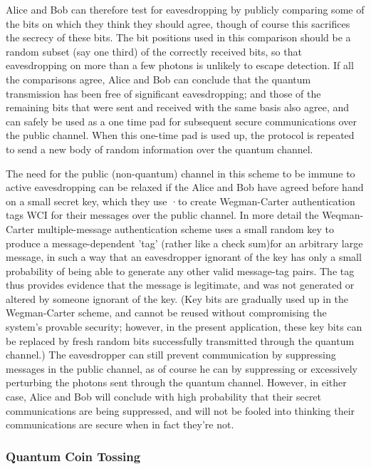 Alice and Bob can therefore test for eaves­dropping by publicly comparing some of the bits on which they think they should agree, though of course this sacrifices the secrecy of these bits. The bit positions used in this comparison should be a random subset (say one third) of the correctly received bits, so that eavesdropping on more than a few pho­tons is unlikely to escape detection. If all the comparisons agree, Alice and Bob can conclude that the quantum transmission has been free of signifi­cant eavesdropping; and those of the remaining bits that were sent and received with the same basis also agree, and can safely be used as a one time pad for subsequent secure communications over the public channel. When this one-time pad is used up, the protocol is repeated to send a new body of random information over the quantum channel.

The need for the public (non-quantum) channel in this scheme to be immune to active eavesdropping can be relaxed if the Alice and Bob have agreed be­fore hand on a small secret key, which they use ·to create Wegman-Carter authentication tags WCI for their messages over the public channel. In more detail the Weqman-Carter multiple-message authenti­cation scheme uses a small random key to produce a message-dependent 'tag' (rather like a check sum)for an arbitrary large message, in such a way that an eavesdropper ignorant of the key has only a small probability of being able to generate any other va­lid message-tag pairs. The tag thus provides evi­dence that the message is legitimate, and was not generated or altered by someone ignorant of the key. (Key bits are gradually used up in the Wegman-Carter scheme, and cannot be reused without compromising the system's provable security; however, in the present application, these key bits can be replaced by fresh random bits successfully transmitted through the quantum channel.) The eavesdropper can still prevent communication by suppressing messages in the public channel, as of course he can by sup­pressing or excessively perturbing the photons sent through the quantum channel. However, in either case, Alice and Bob will conclude with high proba­bility that their secret communications are being suppressed, and will not be fooled into thinking their communications are secure when in fact they're not.

\subsubsection{Quantum Coin Tossing}

